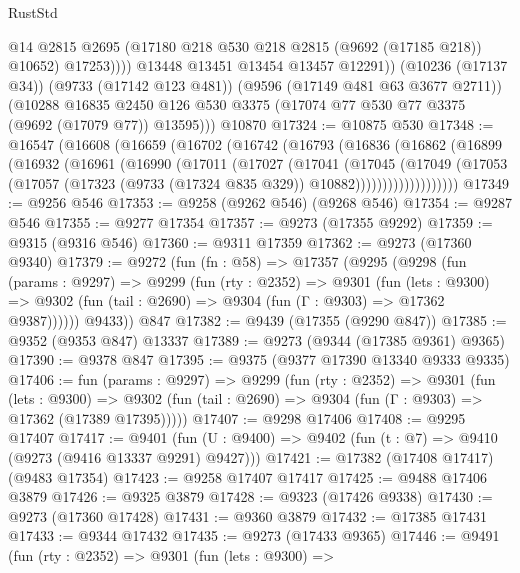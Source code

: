 \begin{lexlean}{RustStd}
\begin{coremodule}
                  @14
                  @2815
                  @2695
                  (@17180 @218 @530 @218 @2815 (@9692 (@17185 @218)) @10652)
                  @17253))))
          @13448
          @13451
          @13454
          @13457
          @12291))
      (@10236 (@17137 @34))
      (@9733 (@17142 @123 @481))
      (@9596 (@17149 @481 @63 @3677 @2711))
      (@10288 @16835 @2450 @126 @530 @3375 (@17074 @77 @530 @77 @3375 (@9692 (@17079 @77)) @13595)))
    @10870
@17324 := @10875 @530
@17348 := @16547
    (@16608
      (@16659
        (@16702
          (@16742
            (@16793
              (@16836
                (@16862
                  (@16899
                    (@16932
                      (@16961
                        (@16990
                          (@17011
                            (@17027
                              (@17041
                                (@17045
                                  (@17049
                                    (@17053
                                      (@17057
                                        (@17323 (@9733 (@17324 @835 @329)) @10882)))))))))))))))))))
@17349 := @9256 @546
@17353 := @9258 (@9262 @546) (@9268 @546)
@17354 := @9287 @546
@17355 := @9277 @17354
@17357 := @9273 (@17355 @9292)
@17359 := @9315 (@9316 @546)
@17360 := @9311 @17359
@17362 := @9273 (@17360 @9340)
@17379 := @9272
    (fun (fn : @58) =>
    @17357
      (@9295
        (@9298
          (fun (params : @9297) =>
          @9299
            (fun (rty : @2352) =>
            @9301
              (fun (lets : @9300) =>
              @9302 (fun (tail : @2690) => @9304 (fun (Γ : @9303) => @17362 @9387))))))
        @9433))
    @847
@17382 := @9439 (@17355 (@9290 @847))
@17385 := @9352 (@9353 @847) @13337
@17389 := @9273 (@9344 (@17385 @9361) @9365)
@17390 := @9378 @847
@17395 := @9375 (@9377 @17390 @13340 @9333 @9335)
@17406 := fun (params : @9297) =>
  @9299
    (fun (rty : @2352) =>
    @9301
      (fun (lets : @9300) =>
      @9302 (fun (tail : @2690) => @9304 (fun (Γ : @9303) => @17362 (@17389 @17395)))))
@17407 := @9298 @17406
@17408 := @9295 @17407
@17417 := @9401
    (fun (U : @9400) => @9402 (fun (t : @7) => @9410 (@9273 (@9416 @13337 @9291) @9427)))
@17421 := @17382 (@17408 @17417) (@9483 @17354)
@17423 := @9258 @17407 @17417
@17425 := @9488 @17406 @3879
@17426 := @9325 @3879
@17428 := @9323 (@17426 @9338)
@17430 := @9273 (@17360 @17428)
@17431 := @9360 @3879
@17432 := @17385 @17431
@17433 := @9344 @17432
@17435 := @9273 (@17433 @9365)
@17446 := @9491
    (fun (rty : @2352) =>
    @9301
      (fun (lets : @9300) =>

\end{coremodule}
\end{lexlean}
